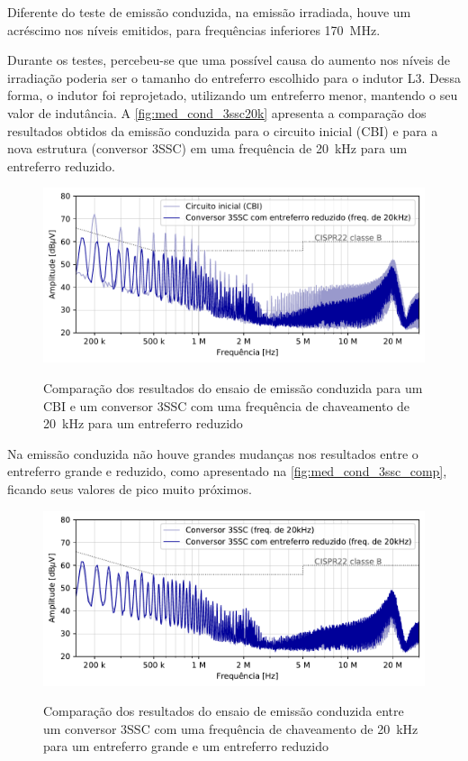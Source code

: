     Diferente do teste de emissão conduzida, na emissão irradiada, houve um acréscimo nos níveis emitidos, para frequências inferiores \qty{170}{\mega\hertz}. 
    
    Durante os testes, percebeu-se que uma possível causa do aumento nos níveis de irradiação poderia ser o tamanho do entreferro escolhido para o indutor L3. Dessa forma, o indutor foi reprojetado, utilizando um entreferro menor, mantendo o seu valor de indutância. A \autoref{fig:med_cond_3ssc20k} apresenta a comparação dos resultados obtidos da emissão conduzida para o circuito inicial (CBI) e para a nova estrutura (conversor 3SSC) em uma frequência de \qty{20}{\kilo\hertz} para um entreferro reduzido.
    
    \begin{figure}[H]
    	\centering
    	\caption{Comparação dos resultados do ensaio de emissão conduzida para um CBI e um conversor 3SSC com uma frequência de chaveamento de \qty{20}{\kilo\hertz} para um entreferro reduzido}
    	\includegraphics[scale=.9]{pdf/cond/Conversor 3SSC com entreferro reduzido (freq. de 20kHz).pdf}
    	\label{fig:med_cond_3ssc20k}
    \end{figure}
    
    Na emissão conduzida não houve grandes mudanças nos resultados entre o entreferro grande e reduzido, como apresentado na \autoref{fig:med_cond_3ssc_comp}, ficando seus valores de pico muito próximos.
    
    \begin{figure}[H]
    	\centering
    	\caption{Comparação dos resultados do ensaio de emissão conduzida entre um conversor 3SSC com uma frequência de chaveamento de \qty{20}{\kilo\hertz} para um entreferro grande e um entreferro reduzido}
    	\includegraphics[scale=.9]{pdf/cond/cond-Conversor 3SSC (freq. de 20kHz)-Conversor 3SSC com entreferro reduzido (freq. de 20kHz).pdf}
    	\label{fig:med_cond_3ssc_comp}
    \end{figure}
    
